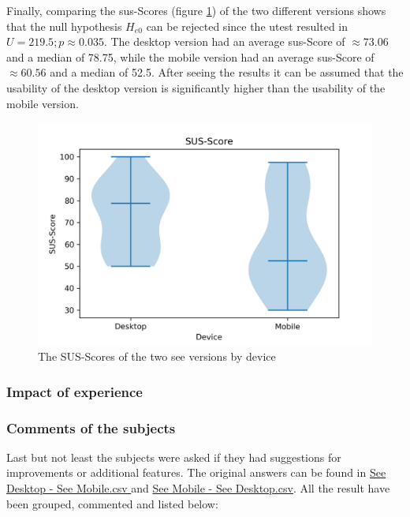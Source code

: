 Finally, comparing the \gls{sus}-Scores (figure \ref{fig:sus-vio}) of the two different versions shows that the null hypothesis $H_{e0}$ can be rejected since the \gls{utest} resulted in $U = 219.5; p \approx 0.035$.
The desktop version had an average \gls{sus}-Score of $\approx 73.06$ and a median of 78.75, while the mobile version had an average \gls{sus}-Score of $\approx 60.56$ and a median of 52.5. 
After seeing the results it can be assumed that the \gls{usability} of the desktop version is significantly higher than the \gls{usability} of the mobile version.
\begin{figure}[htb]
  \centering
  \includegraphics[width=1\textwidth]{Evaluation/img/SUS-Score_violin.png}
  \caption{The SUS-Scores of the two \gls{see} versions by device}\label{fig:sus-vio}
\end{figure}

\subsubsection{Impact of experience}

\subsubsection{Comments of the subjects}
Last but not least the subjects were asked if they had suggestions for improvements or additional features.
The original answers can be found in \hyperref[group1]{See Desktop - See Mobile.csv } and \hyperref[group2]{See Mobile - See Desktop.csv}.
All the result have been grouped, commented and listed below: 

